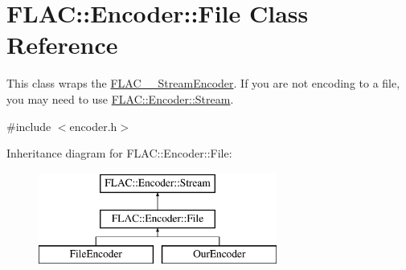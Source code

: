 \hypertarget{class_f_l_a_c_1_1_encoder_1_1_file}{}\section{F\+L\+AC\+:\+:Encoder\+:\+:File Class Reference}
\label{class_f_l_a_c_1_1_encoder_1_1_file}


This class wraps the \hyperlink{struct_f_l_a_c_____stream_encoder}{F\+L\+A\+C\+\_\+\+\_\+\+Stream\+Encoder}. If you are not encoding to a file, you may need to use \hyperlink{class_f_l_a_c_1_1_encoder_1_1_stream}{F\+L\+A\+C\+::\+Encoder\+::\+Stream}.  




{\ttfamily \#include $<$encoder.\+h$>$}

Inheritance diagram for F\+L\+AC\+:\+:Encoder\+:\+:File\+:\begin{figure}[H]
\begin{center}
\leavevmode
\includegraphics[height=3.000000cm]{class_f_l_a_c_1_1_encoder_1_1_file}
\end{center}
\end{figure}
